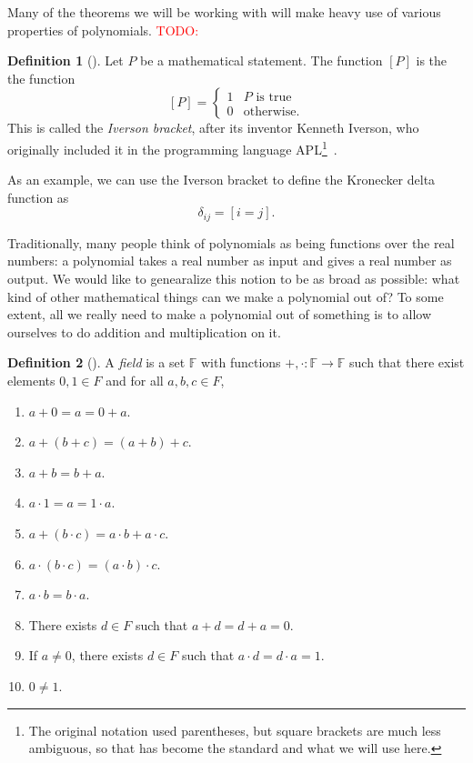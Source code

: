 \documentclass[english,12pt]{reedthesis}
\theoremstyle{plain}
\theoremstyle{definition}
\newtheorem{defn}[defn]{Definition}
\theoremstyle{remark}
\newcommand{\TODO}[1]{\textcolor{red}{TODO: #1}}
\begin{document}
Many of the theorems we will be working with will make heavy use of various
properties of polynomials. \TODO{}

\begin{defn}[{\cite{Knu92}}]\label{def:iverson-bracket}
  Let $P$ be a mathematical statement. The function $[P]$ is the the function
  \begin{equation}\label{eqn:iverson-bracket}
    [P] = \begin{cases}
      1 & P \text{ is true} \\
      0 & \text{otherwise.}
    \end{cases}
  \end{equation}
  This is called the \emph{Iverson bracket}, after its inventor Kenneth Iverson,
  who originally included it in the programming language APL\footnote{The
    original notation used parentheses, but square brackets are much less
    ambiguous, so that has become the standard and what we will use
    here.}~\cite[11]{APL}.
\end{defn}

As an example, we can use the Iverson bracket to define the Kronecker delta
function as
\[
  \delta_{ij} = [i = j].
\]

Traditionally, many people think of polynomials as being functions over the real
numbers: a polynomial takes a real number as input and gives a real number as
output. We would like to genearalize this notion to be as broad as possible:
what kind of other mathematical things can we make a polynomial out of? To some
extent, all we really need to make a polynomial out of something is to allow
ourselves to do addition and multiplication on it.

\begin{defn}[{\cite[Def.\ 2.6.1]{Swan21}}]\label{def:field}
  A \emph{field} is a set $\mathbb{F}$ with functions
  $+, \cdot\colon \mathbb{F} \rightarrow \mathbb{F}$ such that there exist elements $0, 1 \in F$
  and for all $a, b, c \in F$,
  \begin{enumerate}
    \item $a + 0 = a = 0 + a$.
    \item $a + (b + c) = (a + b) + c$.
    \item $a + b = b + a$.
    \item $a \cdot 1 = a = 1 \cdot a$.
    \item $a + (b \cdot c) = a \cdot b + a \cdot c$.
    \item $a \cdot (b \cdot c) = (a \cdot b) \cdot c$.
    \item $a \cdot b = b \cdot a$.
    \item There exists $d \in F$ such that $a + d = d + a = 0$.
    \item If $a \ne 0$, there exists $d \in F$ such that $a \cdot d = d \cdot a = 1$.
    \item $0 \ne 1$.
  \end{enumerate}
\end{defn}
\end{document}
